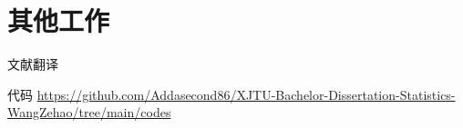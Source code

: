 \section{其他工作}
\begin{frame}{文献翻译}
    
\end{frame}

\begin{frame}{代码}
    \url{https://github.com/Addasecond86/XJTU-Bachelor-Dissertation-Statistics-WangZehao/tree/main/codes}
\end{frame}
